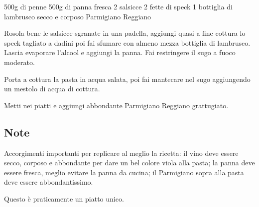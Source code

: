 \begin{ingreds}
	500g di penne
	500g di panna fresca
	2 salsicce
	2 fette di speck
	1 bottiglia di lambrusco secco e corposo
	Parmigiano Reggiano

\end{ingreds}

\begin{method}
Rosola bene le salsicce sgranate in una padella, aggiungi quasi a fine cottura lo speck tagliato a dadini poi fai sfumare con almeno mezza bottiglia di lambrusco. Lascia evaporare l'alcool e aggiungi la panna. Fai restringere il sugo a fuoco moderato.

Porta a cottura la pasta in acqua salata, poi fai mantecare nel sugo aggiungendo un mestolo di acqua di cottura.

Metti nei piatti e aggiungi abbondante Parmigiano Reggiano grattugiato.

\end{method}
\subsection*{Note}
	Accorgimenti importanti per replicare al meglio la ricetta: il vino deve essere secco, corposo e abbondante per dare un bel colore viola alla pasta; la panna deve essere fresca, meglio evitare la panna da cucina; il Parmigiano sopra alla pasta deve essere abbondantissimo.

	Questo è praticamente un piatto unico.


